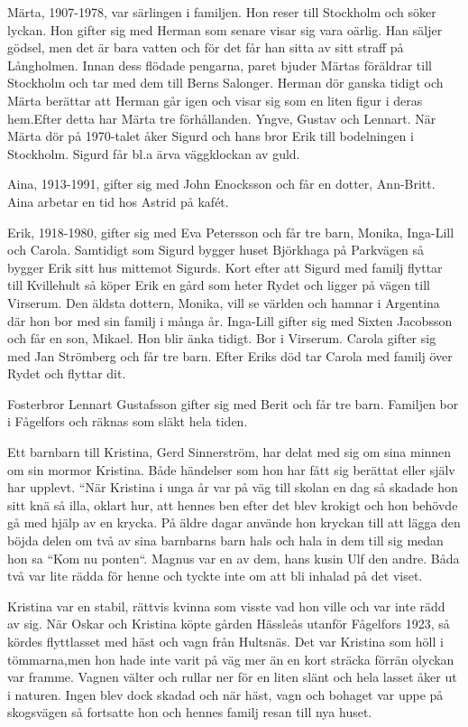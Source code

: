 Märta, 1907-1978, var särlingen i familjen. Hon reser till Stockholm och söker lyckan. Hon gifter sig med Herman som senare visar sig vara oärlig. Han säljer gödsel, men det är bara vatten och för det får han sitta av sitt straff på Långholmen. Innan dess flödade pengarna, paret bjuder Märtas föräldrar till Stockholm och tar med dem till Berns Salonger. Herman dör ganska tidigt och Märta berättar att Herman går igen och visar sig som en liten figur i deras hem.Efter detta har Märta tre förhållanden. Yngve, Gustav och Lennart. När Märta dör på 1970-talet åker Sigurd och hans bror Erik till bodelningen i Stockholm. Sigurd får bl.a ärva väggklockan av guld.

Aina, 1913-1991, gifter sig med John Enocksson och får en dotter, Ann-Britt. Aina arbetar en tid hos Astrid på kafét.

Erik, 1918-1980, gifter sig med Eva Petersson och får tre barn, Monika, Inga-Lill och Carola. Samtidigt som Sigurd bygger huset Björkhaga på Parkvägen så bygger Erik sitt hus mittemot Sigurds. Kort efter att Sigurd med familj flyttar till Kvillehult så köper Erik en gård som heter Rydet och ligger på vägen till Virserum. Den äldsta dottern, Monika, vill se världen och hamnar i Argentina där hon bor med sin familj i många år. Inga-Lill gifter sig med Sixten Jacobsson och får en son, Mikael. Hon blir änka tidigt. Bor i Virserum. Carola gifter sig med Jan Strömberg och får tre barn. Efter Eriks död tar Carola med familj över Rydet och flyttar dit.

Fosterbror Lennart Gustafsson gifter sig med Berit och får tre barn. Familjen bor i Fågelfors och räknas som släkt hela tiden.



Ett barnbarn till Kristina, Gerd Sinnerström, har delat med sig om sina minnen om sin mormor Kristina. Både händelser som hon har fått sig berättat eller själv har upplevt.
“När Kristina i unga år var på väg till skolan en dag så skadade hon sitt knä så illa, oklart hur,  att hennes ben efter det blev krokigt och hon behövde gå med hjälp av en krycka. På äldre dagar använde hon kryckan till att lägga den böjda delen om två av sina barnbarns barn hals och hala in dem till sig medan hon sa “Kom nu ponten“. Magnus var en av dem, hans kusin Ulf den andre. Båda två var lite rädda för henne och tyckte inte om att bli inhalad på det viset.

Kristina var en stabil, rättvis kvinna som visste vad hon ville och var inte rädd av sig. När Oskar och Kristina köpte gården Hässleås utanför Fågelfors 1923, så kördes flyttlasset med häst och vagn från Hultsnäs. Det var Kristina som höll i tömmarna,men hon hade inte varit på väg mer än en kort sträcka förrän olyckan var framme. Vagnen välter och rullar ner för en liten slänt och hela lasset åker ut i naturen. Ingen blev dock skadad och när häst, vagn och bohaget var uppe på skogsvägen så fortsatte hon och hennes familj resan till nya huset.

